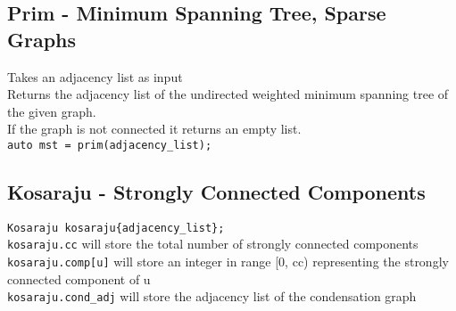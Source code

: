 \subsection{Prim - Minimum Spanning Tree, Sparse Graphs}

Takes an adjacency list as input \\
Returns the adjacency list of the undirected weighted minimum spanning tree of the given graph. \\
If the graph is not connected it returns an empty list. \\
\verb|auto mst = prim(adjacency_list);| \\



\subsection{Kosaraju - Strongly Connected Components}

\verb|Kosaraju kosaraju{adjacency_list};| \\
\verb|kosaraju.cc| will store the total number of strongly connected components \\
\verb|kosaraju.comp[u]| will store an integer in range [0, cc) representing the strongly connected component of u \\
\verb|kosaraju.cond_adj| will store the adjacency list of the condensation graph

